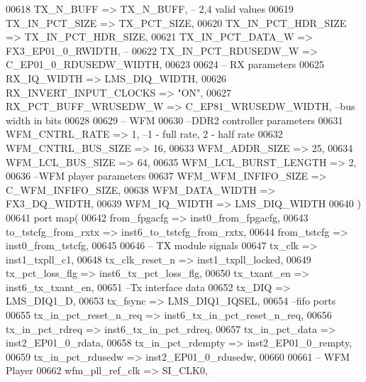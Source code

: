 \begin{DoxyCode}
00618       TX_N_BUFF               => TX_N_BUFF,\textcolor{keyword}{              -- 2,4 valid values}
00619       TX_IN_PCT_SIZE          => TX_PCT_SIZE,
00620       TX_IN_PCT_HDR_SIZE      => TX_IN_PCT_HDR_SIZE,
00621       TX_IN_PCT_DATA_W        => FX3_EP01_0_RWIDTH,\textcolor{keyword}{      -- }
00622       TX_IN_PCT_RDUSEDW_W     => C_EP01_0_RDUSEDW_WIDTH,
00623       
00624 \textcolor{keyword}{      -- RX parameters}
00625       RX_IQ_WIDTH             => LMS_DIQ_WIDTH,
00626       RX_INVERT_INPUT_CLOCKS  => \textcolor{keyword}{"ON"},
00627       RX_PCT_BUFF_WRUSEDW_W   => C_EP81_WRUSEDW_WIDTH,\textcolor{keyword}{ --bus width in bits }
00628       
00629 \textcolor{keyword}{      -- WFM}
00630 \textcolor{keyword}{      --DDR2 controller parameters}
00631       WFM_CNTRL_RATE          => \textcolor{vhdllogic}{1},\textcolor{keyword}{ --1 - full rate, 2 - half rate}
00632       WFM_CNTRL_BUS_SIZE      => \textcolor{vhdllogic}{16},
00633       WFM_ADDR_SIZE           => \textcolor{vhdllogic}{25},
00634       WFM_LCL_BUS_SIZE        => \textcolor{vhdllogic}{64},
00635       WFM_LCL_BURST_LENGTH    => \textcolor{vhdllogic}{2},
00636 \textcolor{keyword}{      --WFM player parameters}
00637       WFM_WFM_INFIFO_SIZE     => C_WFM_INFIFO_SIZE,
00638       WFM_DATA_WIDTH          => FX3_DQ_WIDTH,
00639       WFM_IQ_WIDTH            => LMS_DIQ_WIDTH
00640    \textcolor{vhdlchar}{)}
00641    \textcolor{keywordflow}{port} \textcolor{keywordflow}{map}(                                             
00642       from_fpgacfg            => inst0_from_fpgacfg,
00643       to_tstcfg_from_rxtx     => inst6_to_tstcfg_from_rxtx,
00644       from_tstcfg             => inst0_from_tstcfg,
00645       
00646 \textcolor{keyword}{      -- TX module signals}
00647       tx_clk                  => inst1_txpll_c1,
00648       tx_clk_reset_n          => inst1_txpll_locked,     
00649       tx_pct_loss_flg         => inst6_tx_pct_loss_flg,
00650       tx_txant_en             => inst6_tx_txant_en,  
00651 \textcolor{keyword}{      --Tx interface data }
00652       tx_DIQ                  => LMS_DIQ1_D,
00653       tx_fsync                => LMS_DIQ1_IQSEL,
00654 \textcolor{keyword}{      --fifo ports}
00655       tx_in_pct_reset_n_req   => inst6_tx_in_pct_reset_n_req,
00656       tx_in_pct_rdreq         => inst6_tx_in_pct_rdreq,
00657       tx_in_pct_data          => inst2_EP01_0_rdata,
00658       tx_in_pct_rdempty       => inst2_EP01_0_rempty,
00659       tx_in_pct_rdusedw       => inst2_EP01_0_rdusedw,
00660       
00661 \textcolor{keyword}{      -- WFM Player}
00662       wfm_pll_ref_clk         => SI_CLK0,

\end{DoxyCode}
